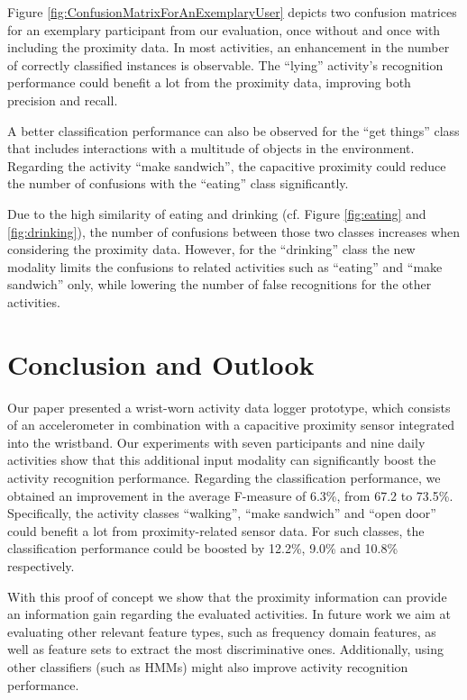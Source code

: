 \documentclass[runningheads,a4paper]{llncs}
\begin{document}
Figure \ref{fig:ConfusionMatrixForAnExemplaryUser}  depicts two confusion matrices for an exemplary participant from our evaluation, once without and once with including the proximity data. In most activities, an enhancement in the number of correctly classified instances is observable. The ``lying'' activity's recognition performance could benefit a lot from the proximity data, improving both precision and recall. 

A better classification performance can also be observed for the ``get things'' class that includes interactions with a multitude of objects in the environment. Regarding the activity ``make sandwich'', the capacitive proximity could reduce the number of confusions with the ``eating'' class significantly.

Due to the high similarity of eating and drinking (cf. Figure \ref{fig:eating} and \ref{fig:drinking}), the number of confusions between those two classes increases when considering the proximity data. However, for the ``drinking'' class the new modality limits the confusions to related activities such as ``eating'' and ``make sandwich'' only, while lowering the number of false recognitions for the other activities.

\section{Conclusion and Outlook}
\label{sect:conclusions}

Our paper presented a wrist-worn activity data logger prototype, which consists of an accelerometer in combination with a capacitive proximity sensor integrated into the wristband. Our experiments with seven participants and nine daily activities show that this additional input modality can significantly boost the activity recognition performance.
Regarding the classification performance, we obtained an improvement in the average F-measure of 6.3\%, from 67.2 to 73.5\%. Specifically, the activity classes ``walking'', ``make sandwich'' and ``open door'' could benefit a lot from proximity-related sensor data. For such classes, the classification performance could be boosted by 12.2\%, 9.0\% and 10.8\% respectively. 

With this proof of concept we show that the proximity information can provide an information gain regarding the evaluated activities. In future work we aim at evaluating other relevant feature types, such as frequency domain features, as well as feature sets to extract the most discriminative ones. Additionally, using other classifiers (such as HMMs) might also improve activity recognition performance.
\end{document}

